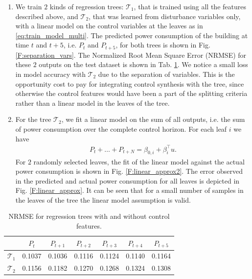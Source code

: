 \textcolor[rgb]{1.00,0.00,0.00}{\begin{enumerate}[leftmargin=1cm]
\item We train $2$ kinds of regression trees: $\mathcal{T}_1$, that is trained using all the features described above, and $\mathcal{T}_2$, that was learned from disturbance variables only, with a linear model on the control variables at the leaves as in \eqref{eq:train_model_multi}.
The predicted power consumption of the building at time $t$ and $t+5$, i.e. $P_t$ and $P_{t+5}$, for both trees is shown in Fig. \ref{F:separation_vars}. The Normalized Root Mean Square Error (NRMSE) for these $2$ outputs on the test dataset is shown in Tab. \ref{T:NMRSE_separation_vars}. We notice a small loss in model accuracy with $\mathcal{T}_2$ due to the separation of variables. 
This is the opportunity cost to pay for integrating control synthesis with the tree, since otherwise the control features would have been a part of the splitting criteria rather than a linear model in the leaves of the tree.
\item For the tree $\mathcal{T}_2$, we fit a linear model on the sum of all outputs, i.e. the sum of power consumption over the complete control horizon. For each leaf $i$ we have
\begin{gather}
P_t+ \dots + P_{t+N}  = \beta_{0,i} + \beta_i^\top u.
\end{gather}
For $2$ randomly selected leaves, the fit of the linear model against the actual power consumption is shown in Fig. \ref{F:linear_approx2}. The error observed in the predicted and actual power consumption for all leaves is depicted in Fig. \ref{F:linear_approx}. It can be seen that for a small number of samples in the leaves of the tree the linear model assumption is valid.
\end{enumerate}}

\begin{table}
	\centering
	\caption{NRMSE for regression trees with and without control features.}
	\begin{tabular}{c|c|c|c|c|c|c}
		\toprule
		& $P_t$ &$P_{t+1}$ &$P_{t+2}$ &$P_{t+3}$ &$P_{t+4}$ & $P_{t+5}$ \\
		\midrule
		$\mathcal{T}_1$     & 0.1037  &  0.1036 &   0.1116 &   0.1124 &   0.1140  &  0.1164  \\
		$\mathcal{T}_2$     & 0.1156  &  0.1182 &   0.1270 &   0.1268 &   0.1324  &  0.1308  \\
		\bottomrule
	\end{tabular}
	\label{T:NMRSE_separation_vars}
\end{table}

